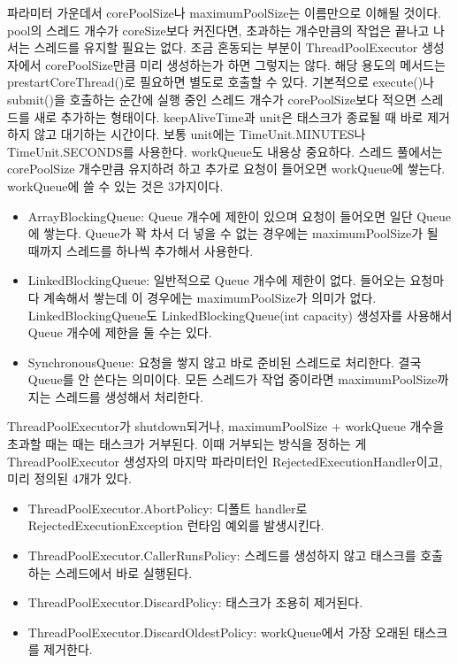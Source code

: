 파라미터 가운데서 corePoolSize나 maximumPoolSize는 이름만으로 이해될 것이다. 
pool의 스레드 개수가 coreSize보다 커진다면, 초과하는 개수만큼의 작업은 끝나고 나서는 스레드를 유지할 필요는 없다. 
조금 혼동되는 부분이 ThreadPoolExecutor 생성자에서 corePoolSize만큼 미리 생성하는가 하면 그렇지는 않다. 
해당 용도의 메서드는 prestartCoreThread()로 필요하면 별도로 호출할 수 있다. 
기본적으로 execute()나 submit()을 호출하는 순간에 실행 중인 스레드 개수가 corePoolSize보다 적으면 스레드를 새로 추가하는 형태이다.
keepAliveTime과 unit은 태스크가 종료될 때 바로 제거하지 않고 대기하는 시간이다. 
보통 unit에는 TimeUnit.MINUTES나 TimeUnit.SECONDS를 사용한다.
workQueue도 내용상 중요하다. 스레드 풀에서는 corePoolSize 개수만큼 유지하려 하고 추가로 요청이 들어오면 workQueue에 쌓는다. 
workQueue에 쓸 수 있는 것은 3가지이다.
\begin{itemize}
\item ArrayBlockingQueue: Queue 개수에 제한이 있으며 요청이 들어오면 일단 Queue에 쌓는다. 
Queue가 꽉 차서 더 넣을 수 없는 경우에는 maximumPoolSize가 될 때까지 스레드를 하나씩 추가해서 사용한다.

\item LinkedBlockingQueue: 일반적으로 Queue 개수에 제한이 없다. 들어오는 요청마다 계속해서 쌓는데 이 경우에는 maximumPoolSize가 의미가 없다.
LinkedBlockingQueue도 LinkedBlockingQueue(int capacity) 생성자를 사용해서 Queue 개수에 제한을 둘 수는 있다.

\item SynchronousQueue: 요청을 쌓지 않고 바로 준비된 스레드로 처리한다. 결국 Queue를 안 쓴다는 의미이다.
모든 스레드가 작업 중이라면 maximumPoolSize까지는 스레드를 생성해서 처리한다. 
\end{itemize}

ThreadPoolExecutor가 shutdown되거나, maximumPoolSize + workQueue 개수을 초과할 때는 때는 태스크가 거부된다. 
이때 거부되는 방식을 정하는 게 ThreadPoolExecutor 생성자의 마지막 파라미터인 RejectedExecutionHandler이고, 미리 정의된 4개가 있다.
\begin{itemize}
\item ThreadPoolExecutor.AbortPolicy: 디폴트 handler로 RejectedExecutionException 런타임 예외를 발생시킨다.

\item ThreadPoolExecutor.CallerRunsPolicy: 스레드를 생성하지 않고 태스크를 호출하는 스레드에서 바로 실행된다. 

\item ThreadPoolExecutor.DiscardPolicy: 태스크가 조용히 제거된다.

\item ThreadPoolExecutor.DiscardOldestPolicy: workQueue에서 가장 오래된 태스크를 제거한다.
\end{itemize}

